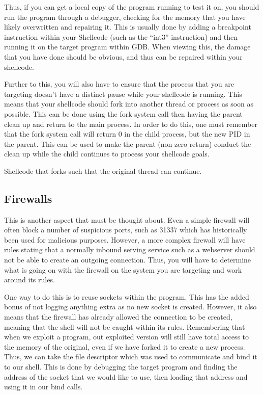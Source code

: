 			Thus, if you can get a local copy of the program running to test it on, you should run the program through a debugger, checking for the memory that you have likely overwritten and repairing it.
			This is usually done by adding a breakpoint instruction within your Shellcode (such as the ``int3'' instruction) and then running it on the target program within GDB.
			When viewing this, the damage that you have done should be obvious, and thus can be repaired within your shellcode.

			Further to this, you will also have to ensure that the process that you are targeting doesn't have a distinct pause while your shellcode is running.
			This means that your shellcode should fork into another thread or process as soon as possible.
			This can be done using the fork system call then having the parent clean up and return to the main process.
			In order to do this, one must remember that the fork system call will return 0 in the child process, but the new PID in the parent.
			This can be used to make the parent (non-zero return) conduct the clean up while the child continues to process your shellcode goals.
			\begin{code}
				\caption{Shellcode that forks such that the original thread can continue. }
				\label{code:ForkShellCode}
			\end{code}

		\subsection{Firewalls}
			This is another aspect that must be thought about.
			Even a simple firewall will often block a number of suspicious ports, such as 31337 which has historically been used for malicious purposes.
			However, a more complex firewall will have rules stating that a normally inbound serving service such as a webserver should not be able to create an outgoing connection.
			Thus, you will have to determine what is going on with the firewall on the system you are targeting and work around its rules.

			One way to do this is to reuse sockets within the program.
			This has the added bonus of not logging anything extra as no new socket is created.
			However, it also means that the firewall has already allowed the connection to be created, meaning that the shell will not be caught within its rules.
			Remembering that when we exploit a program, out exploited version will still have total access to the memory of the original, even if we have forked it to create a new process.
			Thus, we can take the file descriptor which was used to communicate and bind it to our shell.
			This is done by debugging the target program and finding the address of the socket that we would like to use, then loading that address and using it in our bind calls.

